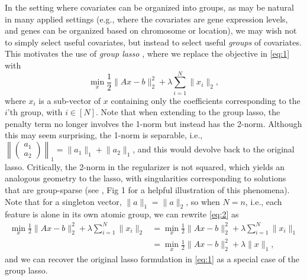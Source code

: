 \documentclass{article}
\begin{document}
In the setting where covariates can be organized into groups, as may be natural in many applied settings (e.g., where the covariates are gene expression levels, and genes can be organized based on chromosome or location), we may wish not to simply select useful covariates, but instead to select useful \emph{groups} of covariates.
This motivates the use of \emph{group lasso} \cite{yuan_model_2006}, where we replace the objective in \eqref{eq:1} with
\begin{equation}
  \label{eq:2}
  \operatorname*{min}_x \frac{1}{2} \lVert Ax - b \rVert_2^2 + \lambda \sum_{i=1}^N \lVert x_i \rVert_2,
\end{equation}
where $x_i$ is a sub-vector of $x$ containing only the coefficients corresponding to the $i$'th group, with $i \in [N]$.
Note that when extending to the group lasso, the penalty term no longer involves the 1-norm but instead has the 2-norm.
Although this may seem surprising, the 1-norm is separable, i.e., $\left\| \begin{pmatrix} a_1 \\ a_2 \end{pmatrix} \right\|_1 = \lVert a_1 \rVert_1 + \lVert a_2 \rVert_1$, and this would devolve back to the original lasso.
Critically, the 2-norm in the regularizer is not squared, which yields an analogous geometry to the lasso, with singularities corresponding to solutions that are group-sparse (see \cite{yuan_model_2006}, Fig 1 for a helpful illustration of this phenomena).
Note that for a singleton vector, $\lVert a \rVert_1 = \lVert a \rVert_2$, so when $N = n$, i.e., each feature is alone in its own atomic group, we can rewrite \eqref{eq:2} as
\begin{align*}
  \operatorname*{min}_x \frac{1}{2} \lVert Ax - b \rVert_2^2 + \lambda \sum_{i=1}^N \lVert x_i \rVert_2 
  &= \operatorname*{min}_x \frac{1}{2}  \lVert Ax - b \rVert_2^2 + \lambda \sum_{i=1}^N \lVert x_i \rVert_1 \\
  &= \operatorname*{min}_x \frac{1}{2} \lVert Ax - b \rVert_2^2 + \lambda  \lVert x \rVert_1    ,
\end{align*}
and we can recover the original lasso formulation in \eqref{eq:1} as a special case of the group lasso.
\end{document}
